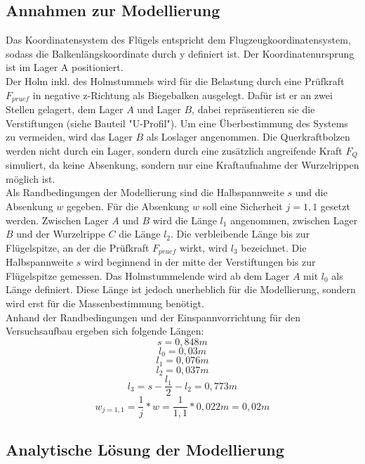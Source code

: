 \subsection{Annahmen zur Modellierung}
Das Koordinatensystem des Flügels entspricht dem Flugzeugkoordinatensystem, sodass die Balkenlängskoordinate durch y definiert ist. Der Koordinatenursprung ist im Lager A positioniert. \\

\noindent Der Holm inkl. des Holmstummels wird für die Belastung durch eine Prüfkraft $F_{pruef}$ in negative z-Richtung als Biegebalken ausgelegt. Dafür ist er an zwei Stellen gelagert, dem Lager $A$ und Lager $B$, dabei repräsentieren sie die Verstiftungen (siehe Bauteil "U-Profil"). Um eine Überbestimmung des Systems zu vermeiden, wird das Lager $B$ als Loslager angenommen. Die Querkraftbolzen werden nicht durch ein Lager, sondern durch eine zusätzlich angreifende Kraft $F_{Q}$ simuliert, da keine Absenkung, sondern nur eine Kraftaufnahme der Wurzelrippen möglich ist. \\

\noindent Als Randbedingungen der Modellierung sind die Halbspannweite $s$ und die Absenkung $w$ gegeben. Für die Absenkung $w$ soll eine Sicherheit $j=1,1$ gesetzt werden. Zwischen Lager $A$ und $B$ wird die Länge $l_{1}$ angenommen, zwischen Lager $B$ und der Wurzelrippe $C$ die Länge $l_{2}$. Die verbleibende Länge bis zur Flügelspitze, an der die Prüfkraft $F_{pruef}$ wirkt, wird $l_{3}$ bezeichnet. Die Halbspannweite $s$ wird beginnend in der mitte der Verstiftungen bis zur Flügelspitze gemessen. Das Holmstummelende wird ab dem Lager $A$ mit $l_{0}$ als Länge definiert. Diese Länge ist jedoch unerheblich für die Modellierung, sondern wird erst für die Massenbestimmung benötigt.\\

\noindent Anhand der Randbedingungen und der Einspannvorrichtung für den Versuchsaufbau ergeben sich folgende Längen: 
\begin{equation}
	s = 0,848 m
\end{equation}
\begin{equation}
	l_{0} = 0,03 m
\end{equation}
\begin{equation}
	l_{1} = 0,076 m
\end{equation}
\begin{equation}
	l_{2} = 0,037 m 
\end{equation}
\begin{equation}
	l_{3} = s - \frac{l_{1}}{2} - l_{2} = 0,773 m
\end{equation}
\begin{equation}
	w_{j=1,1} = \frac{1}{j} * w = \frac{1}{1,1} * 0,022 m = 0,02 m
\end{equation}




\subsection{Analytische Lösung der Modellierung}